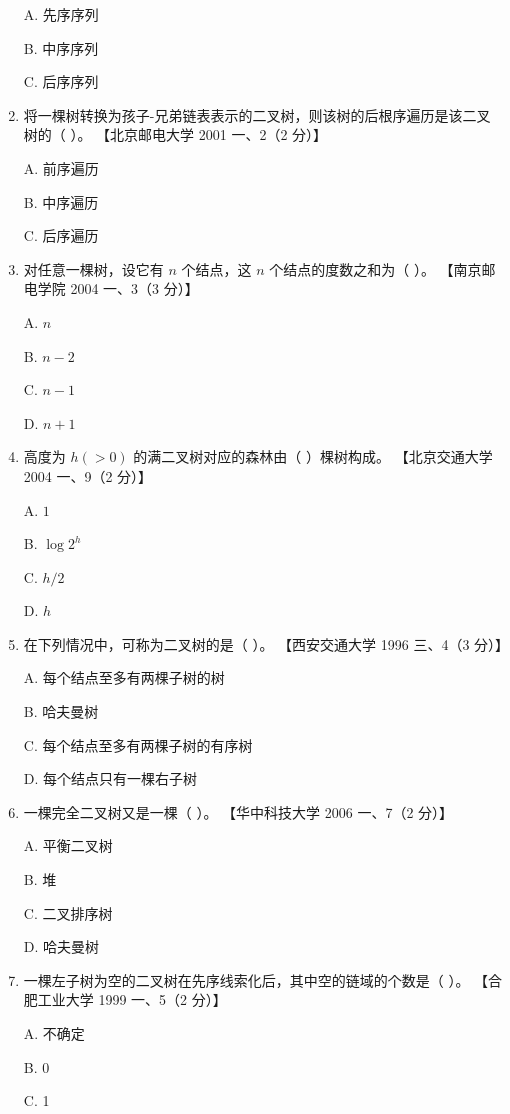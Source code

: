 \documentclass[lang=cn,newtx,10pt,scheme=chinese]{../../elegantbook}
\begin{document}
\begin{enumerate}
    A. 先序序列  

    B. 中序序列  

    C. 后序序列  

    \item 将一棵树转换为孩子-兄弟链表表示的二叉树，则该树的后根序遍历是该二叉树的（ ）。  
    【北京邮电大学 2001 一、2（2 分）】  

    A. 前序遍历  

    B. 中序遍历  

    C. 后序遍历  

    \item 对任意一棵树，设它有 $n$ 个结点，这 $n$ 个结点的度数之和为（ ）。  
    【南京邮电学院 2004 一、3（3 分）】  

    A. $n$  

    B. $n - 2$  

    C. $n - 1$  

    D. $n + 1$  

    \item 高度为 $h (> 0)$ 的满二叉树对应的森林由（ ）棵树构成。  
    【北京交通大学 2004 一、9（2 分）】  

    A. $1$  

    B. $\log2^h$  

    C. $h/2$  

    D. $h$  

    \item 在下列情况中，可称为二叉树的是（ ）。  
    【西安交通大学 1996 三、4（3 分）】  

    A. 每个结点至多有两棵子树的树  

    B. 哈夫曼树  

    C. 每个结点至多有两棵子树的有序树  

    D. 每个结点只有一棵右子树  

    \item 一棵完全二叉树又是一棵（ ）。  
    【华中科技大学 2006 一、7（2 分）】  

    A. 平衡二叉树  

    B. 堆  

    C. 二叉排序树  

    D. 哈夫曼树  

    \item 一棵左子树为空的二叉树在先序线索化后，其中空的链域的个数是（ ）。  
    【合肥工业大学 1999 一、5（2 分）】 

    A. 不确定  

    B. 0  

    C. 1  


\end{enumerate}
\end{document}
